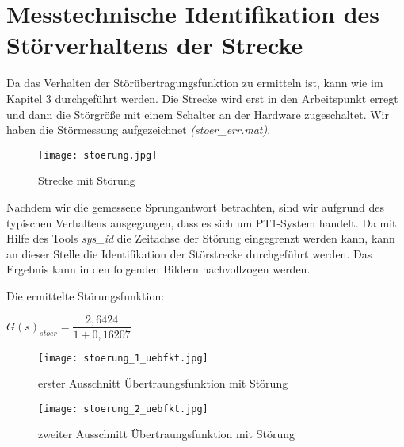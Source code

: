
\newpage
[Perkowski]
\section{Messtechnische Identifikation des Störverhaltens der Strecke}
Da das Verhalten der Störübertragungsfunktion zu ermitteln ist, kann wie im Kapitel 3 durchgeführt werden. Die Strecke wird erst in den Arbeitspunkt erregt und dann die Störgröße mit einem Schalter an der Hardware zugeschaltet. Wir haben die Störmessung aufgezeichnet \textit{(stoer\_err.mat)}.

\begin{figure}[h]
	\begin{center}
		\texttt{[image: stoerung.jpg]}
		\caption{Strecke mit Störung}
       \label{stoer}
	\end{center} 
\end{figure}

Nachdem wir die gemessene Sprungantwort betrachten, sind wir aufgrund des typischen Verhaltens ausgegangen, dass es sich um PT1-System handelt. 
Da mit Hilfe des Tools \textit{sys\_id} die Zeitachse der Störung eingegrenzt werden kann, kann an dieser Stelle die Identifikation der Störstrecke durchgeführt werden. Das Ergebnis kann in den folgenden Bildern nachvollzogen werden.

\newpage

Die ermittelte Störungsfunktion:

\begin{center}
$ G(s)_{stoer} = \dfrac{2,6424}{1 + 0,16207} $
\end{center}

\begin{figure}[h]
	\begin{center}
		\texttt{[image: stoerung\_1\_uebfkt.jpg]}
		\caption{erster Ausschnitt Übertraungsfunktion mit Störung}
       \label{stoerfkt1}
	\end{center} 
\end{figure}

\begin{figure}[h]
	\begin{center}
		\texttt{[image: stoerung\_2\_uebfkt.jpg]}
		\caption{zweiter Ausschnitt Übertraungsfunktion mit Störung}
       \label{stoerfkt2}
	\end{center} 
\end{figure}

